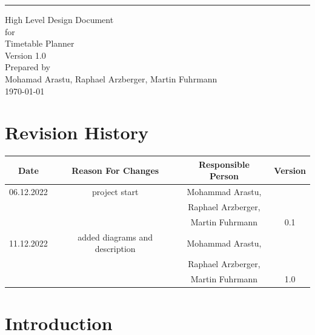 \documentclass{scrreprt}
\date{}
\def\myversion{1.0}
\begin{document}
	
	\begin{flushright}
		\rule{16cm}{5pt}\vskip1cm
		\begin{bfseries}
			\Huge{High Level Design Document}\\
			\vspace{1.9cm}
			for\\
			\vspace{1.9cm}
			Timetable Planner\\
			\vspace{1.9cm}
			\LARGE{Version \myversion}\\
			\vspace{1.9cm}
			Prepared by \\ {\small Mohamad Arastu, Raphael Arzberger, Martin Fuhrmann}
			\vspace{1.9cm} \\
			\today\\
		\end{bfseries}
	\end{flushright}
	
	\tableofcontents
	
	
	\chapter*{Revision History}
	
	\begin{center}
		\begin{tabular}{|c|c|c|c|}
			\hline
			Date & Reason For Changes & Responsible Person & Version\\
			\hline
			06.12.2022 & project start & Mohammad Arastu, & \\&&Raphael Arzberger, & \\&&Martin Fuhrmann & 0.1\\
			\hline
			11.12.2022 & added diagrams and description & Mohammad Arastu, & \\&&Raphael Arzberger, & \\&&Martin Fuhrmann & 1.0\\
			\hline
		\end{tabular}
	\end{center}
	
	\chapter{Introduction}
	
\end{document}
